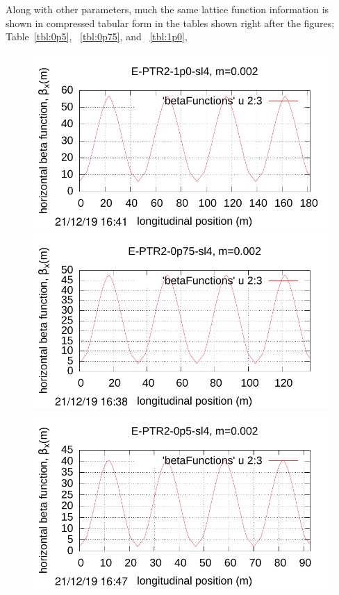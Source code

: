 \documentclass[]{article}
\begin{document}
Along with other parameters, much the same lattice function information is shown in 
compressed tabular form in the tables shown right after the figures; 
Table~\ref{tbl:0p5}, ~\ref{tbl:0p75}, and ~\ref{tbl:1p0},
%
\begin{figure}[htbp]
%
\begin{minipage}[b]{0.5\linewidth}
\centering
\includegraphics[scale=0.67]{pdf/E-PTR2-1p0-COSY-sl4-Fig_II-9-ETEAPOT.pdf}
\includegraphics[scale=0.67]{pdf/E-PTR2-0p75-COSY-sl4-Fig_II-9-ETEAPOT.pdf}
\includegraphics[scale=0.67]{pdf/E-PTR2-0p5-COSY-sl4-Fig_II-9-ETEAPOT.pdf}

\end{minipage}
\end{figure}
\end{document}
